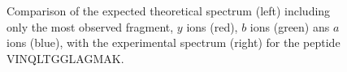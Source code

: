 \begin{figure}
\centering
{}
\caption{\label{fig:spectrum}Comparison of the expected theoretical spectrum
(left) including only the most observed fragment,
$y$ ions (red), $b$ ions (green) ans $a$ ions (blue), with the
experimental spectrum (right) for the peptide VINQLTGGLAGMAK.}
\end{figure}

